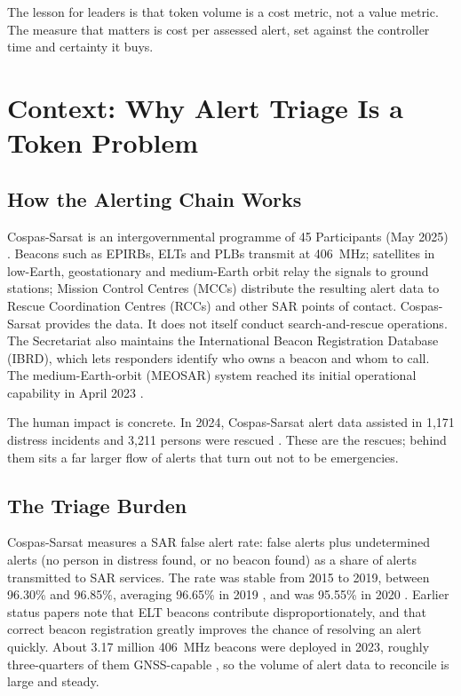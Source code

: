\documentclass[conference]{IEEEtran}
\begin{document}
The lesson for leaders is that token volume is a cost metric, not a value metric. The measure that matters is cost per assessed alert, set against the controller time and certainty it buys.

\section{Context: Why Alert Triage Is a Token Problem}
\label{sec:context}

\subsection{How the Alerting Chain Works}

Cospas-Sarsat is an intergovernmental programme of 45 Participants (May 2025) \cite{wg11}. Beacons such as EPIRBs, ELTs and PLBs transmit at 406~MHz; satellites in low-Earth, geostationary and medium-Earth orbit relay the signals to ground stations; Mission Control Centres (MCCs) distribute the resulting alert data to Rescue Coordination Centres (RCCs) and other SAR points of contact. Cospas-Sarsat provides the data. It does not itself conduct search-and-rescue operations. The Secretariat also maintains the International Beacon Registration Database (IBRD), which lets responders identify who owns a beacon and whom to call. The medium-Earth-orbit (MEOSAR) system reached its initial operational capability in April 2023 \cite{wg10}.

The human impact is concrete. In 2024, Cospas-Sarsat alert data assisted in 1,171 distress incidents and 3,211 persons were rescued \cite{wg11}. These are the rescues; behind them sits a far larger flow of alerts that turn out not to be emergencies.

\subsection{The Triage Burden}
\label{sec:triage}

Cospas-Sarsat measures a SAR false alert rate: false alerts plus undetermined alerts (no person in distress found, or no beacon found) as a share of alerts transmitted to SAR services. The rate was stable from 2015 to 2019, between 96.30\% and 96.85\%, averaging 96.65\% in 2019 \cite{far}, and was 95.55\% in 2020 \cite{sartf2}. Earlier status papers note that ELT beacons contribute disproportionately, and that correct beacon registration greatly improves the chance of resolving an alert quickly. About 3.17 million 406~MHz beacons were deployed in 2023, roughly three-quarters of them GNSS-capable \cite{baku}, so the volume of alert data to reconcile is large and steady.
\end{document}
